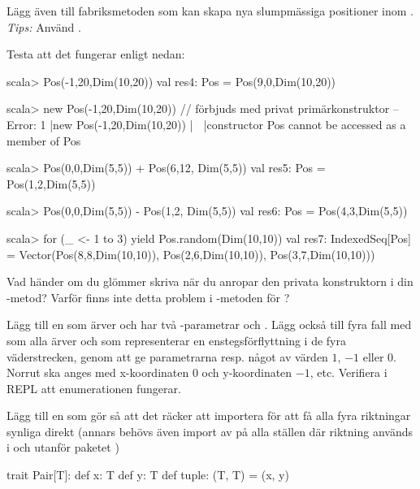 Lägg även till fabriksmetoden  som kan skapa nya slumpmässiga positioner inom . \emph{Tips:} Använd .

Testa att det fungerar enligt nedan:
\begin{REPLnonum}
scala> Pos(-1,20,Dim(10,20))
val res4: Pos = Pos(9,0,Dim(10,20))

scala> new Pos(-1,20,Dim(10,20))  // förbjuds med privat primärkonstruktor
-- Error:
1 |new Pos(-1,20,Dim(10,20))
  |    ^^^
  |constructor Pos cannot be accessed as a member of Pos

scala> Pos(0,0,Dim(5,5)) + Pos(6,12, Dim(5,5))                                                                     
val res5: Pos = Pos(1,2,Dim(5,5))

scala> Pos(0,0,Dim(5,5)) - Pos(1,2, Dim(5,5))                                                                     
val res6: Pos = Pos(4,3,Dim(5,5))

scala> for (_ <- 1 to 3) yield Pos.random(Dim(10,10))
val res7: IndexedSeq[Pos] = 
  Vector(Pos(8,8,Dim(10,10)), Pos(2,6,Dim(10,10)), Pos(3,7,Dim(10,10)))
\end{REPLnonum}

\Subtask Vad händer om du glömmer skriva  när du anropar den privata konstruktorn i din -metod? Varför finns inte detta problem i -metoden för ?

\Subtask Lägg till en  som ärver  och har två -parametrar  och . Lägg också till fyra fall med  som alla ärver  och som representerar en enstegsförflyttning i de fyra väderstrecken, genom att ge parametrarna  resp.  något av värden $1$, $-1$ eller $0$. Norrut ska anges med x-koordinaten $0$ och y-koordinaten $-1$, etc. Verifiera i REPL att enumerationen fungerar.

Lägg till en  som gör så att det räcker att importera  för att få alla fyra riktningar synliga direkt (annars behövs även import av  på alla ställen där riktning används i och utanför paketet )


\SOLUTION


\TaskSolved \what

\SubtaskSolved
\begin{CodeSmall}
trait Pair[T]:
  def x: T
  def y: T
  def tuple: (T, T) = (x, y)

\end{CodeSmall}

